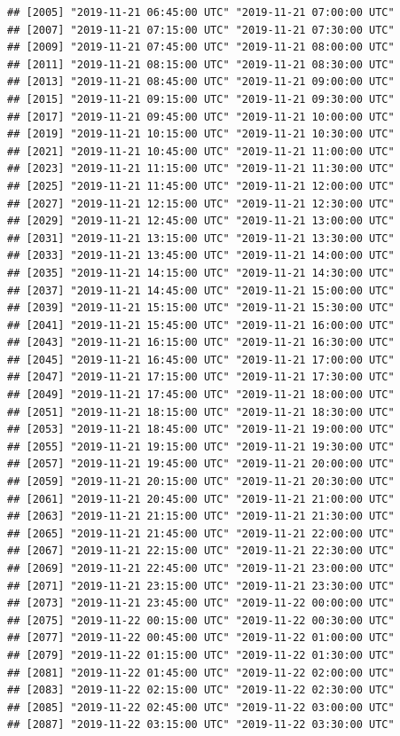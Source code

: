 \documentclass{article}\usepackage[]{graphicx}\usepackage[]{color}
\makeatletter
\newenvironment{kframe}{%
 \def\at@end@of@kframe{}%
 \ifinner\ifhmode%
  \def\at@end@of@kframe{\end{minipage}}%
  \begin{minipage}{\columnwidth}%
 \fi\fi%
 \def\FrameCommand##1{\hskip\@totalleftmargin \hskip-\fboxsep
 \colorbox{shadecolor}{##1}\hskip-\fboxsep
     \hskip-\linewidth \hskip-\@totalleftmargin \hskip\columnwidth}%
 \MakeFramed {\advance\hsize-\width
   \@totalleftmargin\z@ \linewidth\hsize
   \@setminipage}}%
 {\par\unskip\endMakeFramed%
 \at@end@of@kframe}
\newenvironment{knitrout}{}{} %
\makeatother
\begin{document}
\begin{knitrout}
\begin{kframe}
\begin{verbatim}
## [2005] "2019-11-21 06:45:00 UTC" "2019-11-21 07:00:00 UTC"
## [2007] "2019-11-21 07:15:00 UTC" "2019-11-21 07:30:00 UTC"
## [2009] "2019-11-21 07:45:00 UTC" "2019-11-21 08:00:00 UTC"
## [2011] "2019-11-21 08:15:00 UTC" "2019-11-21 08:30:00 UTC"
## [2013] "2019-11-21 08:45:00 UTC" "2019-11-21 09:00:00 UTC"
## [2015] "2019-11-21 09:15:00 UTC" "2019-11-21 09:30:00 UTC"
## [2017] "2019-11-21 09:45:00 UTC" "2019-11-21 10:00:00 UTC"
## [2019] "2019-11-21 10:15:00 UTC" "2019-11-21 10:30:00 UTC"
## [2021] "2019-11-21 10:45:00 UTC" "2019-11-21 11:00:00 UTC"
## [2023] "2019-11-21 11:15:00 UTC" "2019-11-21 11:30:00 UTC"
## [2025] "2019-11-21 11:45:00 UTC" "2019-11-21 12:00:00 UTC"
## [2027] "2019-11-21 12:15:00 UTC" "2019-11-21 12:30:00 UTC"
## [2029] "2019-11-21 12:45:00 UTC" "2019-11-21 13:00:00 UTC"
## [2031] "2019-11-21 13:15:00 UTC" "2019-11-21 13:30:00 UTC"
## [2033] "2019-11-21 13:45:00 UTC" "2019-11-21 14:00:00 UTC"
## [2035] "2019-11-21 14:15:00 UTC" "2019-11-21 14:30:00 UTC"
## [2037] "2019-11-21 14:45:00 UTC" "2019-11-21 15:00:00 UTC"
## [2039] "2019-11-21 15:15:00 UTC" "2019-11-21 15:30:00 UTC"
## [2041] "2019-11-21 15:45:00 UTC" "2019-11-21 16:00:00 UTC"
## [2043] "2019-11-21 16:15:00 UTC" "2019-11-21 16:30:00 UTC"
## [2045] "2019-11-21 16:45:00 UTC" "2019-11-21 17:00:00 UTC"
## [2047] "2019-11-21 17:15:00 UTC" "2019-11-21 17:30:00 UTC"
## [2049] "2019-11-21 17:45:00 UTC" "2019-11-21 18:00:00 UTC"
## [2051] "2019-11-21 18:15:00 UTC" "2019-11-21 18:30:00 UTC"
## [2053] "2019-11-21 18:45:00 UTC" "2019-11-21 19:00:00 UTC"
## [2055] "2019-11-21 19:15:00 UTC" "2019-11-21 19:30:00 UTC"
## [2057] "2019-11-21 19:45:00 UTC" "2019-11-21 20:00:00 UTC"
## [2059] "2019-11-21 20:15:00 UTC" "2019-11-21 20:30:00 UTC"
## [2061] "2019-11-21 20:45:00 UTC" "2019-11-21 21:00:00 UTC"
## [2063] "2019-11-21 21:15:00 UTC" "2019-11-21 21:30:00 UTC"
## [2065] "2019-11-21 21:45:00 UTC" "2019-11-21 22:00:00 UTC"
## [2067] "2019-11-21 22:15:00 UTC" "2019-11-21 22:30:00 UTC"
## [2069] "2019-11-21 22:45:00 UTC" "2019-11-21 23:00:00 UTC"
## [2071] "2019-11-21 23:15:00 UTC" "2019-11-21 23:30:00 UTC"
## [2073] "2019-11-21 23:45:00 UTC" "2019-11-22 00:00:00 UTC"
## [2075] "2019-11-22 00:15:00 UTC" "2019-11-22 00:30:00 UTC"
## [2077] "2019-11-22 00:45:00 UTC" "2019-11-22 01:00:00 UTC"
## [2079] "2019-11-22 01:15:00 UTC" "2019-11-22 01:30:00 UTC"
## [2081] "2019-11-22 01:45:00 UTC" "2019-11-22 02:00:00 UTC"
## [2083] "2019-11-22 02:15:00 UTC" "2019-11-22 02:30:00 UTC"
## [2085] "2019-11-22 02:45:00 UTC" "2019-11-22 03:00:00 UTC"
## [2087] "2019-11-22 03:15:00 UTC" "2019-11-22 03:30:00 UTC"

\end{verbatim}
\end{kframe}
\end{knitrout}
\end{document}
